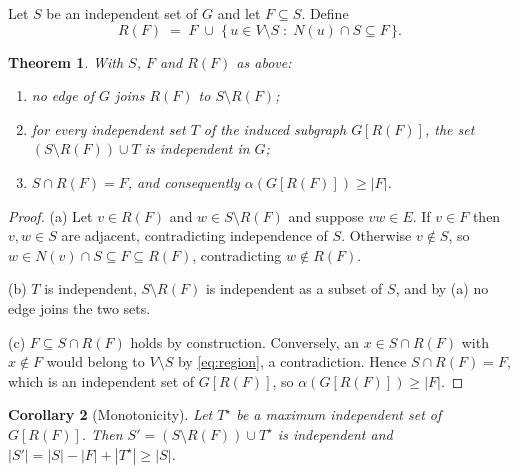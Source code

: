 \documentclass[preprint,12pt]{elsarticle}
\newtheorem{theorem}{Theorem}
\newtheorem{corollary}[theorem]{Corollary}
\theoremstyle{definition}
\begin{document}
Let $S$ be an independent set of $G$ and let $F \subseteq S$. Define
\begin{equation}
R(F) \;=\; F \;\cup\; \{\, u \in V \setminus S \;:\; N(u) \cap S \subseteq F \,\}.
\label{eq:region}
\end{equation}

\begin{theorem}
\label{thm:region}
With $S$, $F$ and $R(F)$ as above:
\begin{enumerate}
\item[(a)] no edge of $G$ joins $R(F)$ to $S \setminus R(F)$;
\item[(b)] for every independent set $T$ of the induced subgraph $G[R(F)]$, the
      set $(S \setminus R(F)) \cup T$ is independent in $G$;
\item[(c)] $S \cap R(F) = F$, and consequently $\alpha(G[R(F)]) \ge |F|$.
\end{enumerate}
\end{theorem}

\begin{proof}
(a) Let $v \in R(F)$ and $w \in S \setminus R(F)$ and suppose $vw \in E$. If
$v \in F$ then $v,w \in S$ are adjacent, contradicting independence of $S$.
Otherwise $v \notin S$, so $w \in N(v) \cap S \subseteq F \subseteq R(F)$,
contradicting $w \notin R(F)$.

(b) $T$ is independent, $S \setminus R(F)$ is independent as a subset of $S$,
and by (a) no edge joins the two sets.

(c) $F \subseteq S \cap R(F)$ holds by construction. Conversely, an
$x \in S \cap R(F)$ with $x \notin F$ would belong to $V \setminus S$ by
\eqref{eq:region}, a contradiction. Hence $S \cap R(F) = F$, which is an
independent set of $G[R(F)]$, so $\alpha(G[R(F)]) \ge |F|$.
\end{proof}

\begin{corollary}[Monotonicity]
\label{cor:monotone}
Let $T^\star$ be a maximum independent set of $G[R(F)]$. Then
$S' = (S \setminus R(F)) \cup T^\star$ is independent and
$|S'| = |S| - |F| + |T^\star| \ge |S|$.
\end{corollary}
\end{document}
